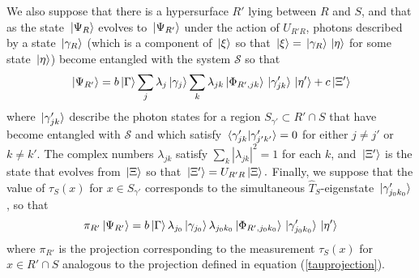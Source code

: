 We also suppose that there is a hypersurface $R'$ lying between $R$ and $S$, and that as the state $\ket*{\Psi_R}$ evolves to $\ket*{\Psi_{R'}}$ under the action of $U_{R'R}$, photons described by a state $\ket*{\gamma_R}$ (which is a component of $\ket*{\xi}$ so that $\ket*{\xi}=\ket*{\gamma_R}\ket*{\eta}$ for some state $\ket*{\eta}$) become entangled with the system $\mathcal{S}$ so that
\begin{equation}
\ket*{\Psi_{R'}}=b\ket*{\Gamma}\sum_j \lambda_j \ket*{\gamma_{j}} \sum_k\lambda_{jk} \ket*{\Phi_{R', jk}}\ket*{\gamma_{jk}'}\ket*{\eta'}+c\ket*{\Xi'}
\end{equation}
where $\ket*{\gamma_{jk}'}$ describe the photon states for a region $S_{\gamma'}\subset R'\cap S$ that have become entangled with $\mathcal{S}$ and which satisfy  $\ip*{\gamma_{jk}'}{\gamma_{j'k'}'}=0$ for either $j\neq j'$ or $k\neq k'$. The complex numbers $\lambda_{jk}$ satisfy $\sum_k|\lambda_{jk}|^2=1$ for each $k$, and $\ket*{\Xi'}$ is the state that evolves from $\ket*{\Xi}$ so that $\ket*{\Xi'}=U_{R'R}\ket*{\Xi}.$ Finally, we suppose that the value of $\tau_S(x)$ for $x\in S_{\gamma'}$ corresponds to the simultaneous $\hat{T}_S$-eigenstate $\ket*{\gamma_{j_0k_0}'}$, so that
$$\pi_{R'}\ket*{\Psi_{R'}}= b\ket*{\Gamma} \lambda_{j_0} \ket*{\gamma_{j_0}} \lambda_{j_0k_0} \ket*{\Phi_{R', j_0k_0}}\ket*{\gamma_{j_0k_0}'}\ket*{\eta'}$$
where $\pi_{R'}$ is the projection corresponding to the measurement $\tau_S(x)$ for $x\in R'\cap S$ analogous to the projection defined in equation (\ref{tauprojection}).

